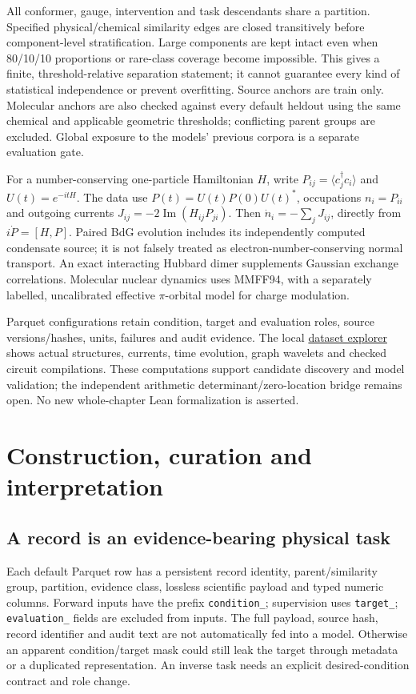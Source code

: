 \documentclass[11pt,oneside,openany]{book}
\theoremstyle{definition}\newtheorem{definition}[theorem]{Definition}
\theoremstyle{remark}\newtheorem{remark}[theorem]{Remark}
\begin{document}
All conformer, gauge, intervention and task descendants share a partition.
Specified physical/chemical similarity edges are closed transitively before
component-level stratification. Large components are kept intact even when
80/10/10 proportions or rare-class coverage become impossible. This gives a
finite, threshold-relative separation statement; it cannot guarantee every
kind of statistical independence or prevent overfitting. Source anchors are
train only. Molecular anchors are also checked against every default heldout
using the same chemical and applicable geometric thresholds; conflicting parent
groups are excluded. Global exposure to the models' previous corpora is a separate
evaluation gate.

For a number-conserving one-particle Hamiltonian $H$, write
$P_{ij}=\langle c_j^\dagger c_i\rangle$ and $U(t)=e^{-itH}$.
The data use $P(t)=U(t)P(0)U(t)^*$, occupations $n_i=P_{ii}$ and
outgoing currents $J_{ij}=-2\operatorname{Im}(H_{ij}P_{ji})$.
Then $\dot n_i=-\sum_jJ_{ij}$, directly from $i\dot P=[H,P]$.
Paired BdG evolution includes its independently computed condensate source;
it is not falsely treated as electron-number-conserving normal transport.
An exact interacting Hubbard dimer supplements Gaussian exchange correlations.
Molecular nuclear dynamics uses MMFF94, with a separately labelled,
uncalibrated effective $\pi$-orbital model for charge modulation.

Parquet configurations retain condition, target and evaluation roles, source
versions/hashes, units, failures and audit evidence. The local
\href{http://127.0.0.1:8765/datasets.html}{dataset explorer} shows actual
structures, currents, time evolution, graph wavelets and checked circuit
compilations. These computations support candidate discovery and model
validation; the independent arithmetic determinant/zero-location bridge remains
open. No new whole-chapter Lean formalization is asserted.

\section{Construction, curation and interpretation}
\subsection{A record is an evidence-bearing physical task}
Each default Parquet row has a persistent record identity, parent/similarity
group, partition, evidence class, lossless scientific payload and typed numeric
columns. Forward inputs have the prefix \texttt{condition\_}; supervision uses
\texttt{target\_}; \texttt{evaluation\_} fields are excluded from inputs.
The full payload, source hash, record identifier and audit text are not
automatically fed into a model. Otherwise an apparent condition/target mask
could still leak the target through metadata or a duplicated representation.
An inverse task needs an explicit desired-condition contract and role change.
\end{document}

